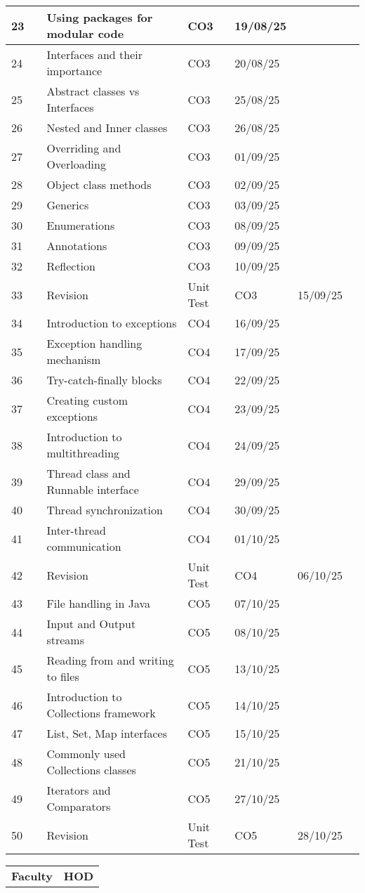 \documentclass[12pt]{article}
\begin{document}
\begin{longtable}{|p{1cm}|p{3.5cm}|p{6cm}|p{1cm}|p{2cm}|p{2cm}|p{2cm}|}
23 &  & Using packages for modular code & CO3 & 19/08/25 &  &  \\\hline
24 &  & Interfaces and their importance & CO3 & 20/08/25 &  &  \\\hline
25 &  & Abstract classes vs Interfaces & CO3 & 25/08/25 &  &  \\\hline
26 &  & Nested and Inner classes & CO3 & 26/08/25 &  &  \\\hline
27 &  & Overriding and Overloading & CO3 & 01/09/25 &  &  \\\hline
28 &  & Object class methods & CO3 & 02/09/25 &  &  \\\hline
29 &  & Generics & CO3 & 03/09/25 &  &  \\\hline
30 &  & Enumerations & CO3 & 08/09/25 &  &  \\\hline
31 &  & Annotations & CO3 & 09/09/25 &  &  \\\hline
32 &  & Reflection & CO3 & 10/09/25 &  &  \\\hline
33 &  & Revision & Unit Test & CO3 & 15/09/25 &  &  \\\hline
34 &  & Introduction to exceptions & CO4 & 16/09/25 &  &  \\\hline
35 &  & Exception handling mechanism & CO4 & 17/09/25 &  &  \\\hline
36 &  & Try-catch-finally blocks & CO4 & 22/09/25 &  &  \\\hline
37 &  & Creating custom exceptions & CO4 & 23/09/25 &  &  \\\hline
38 &  & Introduction to multithreading & CO4 & 24/09/25 &  &  \\\hline
39 &  & Thread class and Runnable interface & CO4 & 29/09/25 &  &  \\\hline
40 &  & Thread synchronization & CO4 & 30/09/25 &  &  \\\hline
41 &  & Inter-thread communication & CO4 & 01/10/25 &  &  \\\hline
42 &  & Revision & Unit Test & CO4 & 06/10/25 &  &  \\\hline
43 &  & File handling in Java & CO5 & 07/10/25 &  &  \\\hline
44 &  & Input and Output streams & CO5 & 08/10/25 &  &  \\\hline
45 &  & Reading from and writing to files & CO5 & 13/10/25 &  &  \\\hline
46 &  & Introduction to Collections framework & CO5 & 14/10/25 &  &  \\\hline
47 &  & List, Set, Map interfaces & CO5 & 15/10/25 &  &  \\\hline
48 &  & Commonly used Collections classes & CO5 & 21/10/25 &  &  \\\hline
49 &  & Iterators and Comparators & CO5 & 27/10/25 &  &  \\\hline
50 &  & Revision & Unit Test & CO5 & 28/10/25 &  &  \\\hline
\end{longtable}

\vspace{1cm}

\begin{tabular}{p{8cm}p{8cm}}
\textbf{Faculty} & \textbf{HOD} \\
\end{tabular}
\end{document}
